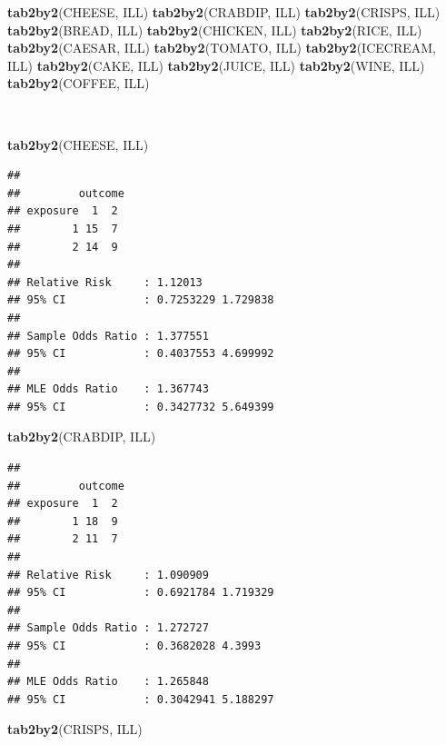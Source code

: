 \documentclass[12pt,a4paper]{book}
\newenvironment{Shaded}{\begin{snugshade}}{\end{snugshade}}
\newcommand{\KeywordTok}[1]{\textcolor[rgb]{0.13,0.29,0.53}{\textbf{#1}}}
\newcommand{\NormalTok}[1]{#1}
\theoremstyle{definition}
\theoremstyle{definition}
\theoremstyle{definition}
\theoremstyle{remark}
\begin{document}
\begin{Shaded}
\begin{Highlighting}[]
\KeywordTok{tab2by2}\NormalTok{(CHEESE, ILL)}
\KeywordTok{tab2by2}\NormalTok{(CRABDIP, ILL)}
\KeywordTok{tab2by2}\NormalTok{(CRISPS, ILL)}
\KeywordTok{tab2by2}\NormalTok{(BREAD, ILL)}
\KeywordTok{tab2by2}\NormalTok{(CHICKEN, ILL)}
\KeywordTok{tab2by2}\NormalTok{(RICE, ILL)}
\KeywordTok{tab2by2}\NormalTok{(CAESAR, ILL)}
\KeywordTok{tab2by2}\NormalTok{(TOMATO, ILL)}
\KeywordTok{tab2by2}\NormalTok{(ICECREAM, ILL)}
\KeywordTok{tab2by2}\NormalTok{(CAKE, ILL)}
\KeywordTok{tab2by2}\NormalTok{(JUICE, ILL)}
\KeywordTok{tab2by2}\NormalTok{(WINE, ILL)}
\KeywordTok{tab2by2}\NormalTok{(COFFEE, ILL)}
\end{Highlighting}
\end{Shaded}

~

\begin{Shaded}
\begin{Highlighting}[]
\KeywordTok{tab2by2}\NormalTok{(CHEESE, ILL)}
\end{Highlighting}
\end{Shaded}

\begin{verbatim}
## 
##         outcome
## exposure  1  2
##        1 15  7
##        2 14  9
## 
## Relative Risk     : 1.12013 
## 95% CI            : 0.7253229 1.729838 
## 
## Sample Odds Ratio : 1.377551 
## 95% CI            : 0.4037553 4.699992 
## 
## MLE Odds Ratio    : 1.367743 
## 95% CI            : 0.3427732 5.649399
\end{verbatim}

\newpage

\begin{Shaded}
\begin{Highlighting}[]
\KeywordTok{tab2by2}\NormalTok{(CRABDIP, ILL)}
\end{Highlighting}
\end{Shaded}

\begin{verbatim}
## 
##         outcome
## exposure  1  2
##        1 18  9
##        2 11  7
## 
## Relative Risk     : 1.090909 
## 95% CI            : 0.6921784 1.719329 
## 
## Sample Odds Ratio : 1.272727 
## 95% CI            : 0.3682028 4.3993 
## 
## MLE Odds Ratio    : 1.265848 
## 95% CI            : 0.3042941 5.188297
\end{verbatim}

\begin{Shaded}
\begin{Highlighting}[]
\KeywordTok{tab2by2}\NormalTok{(CRISPS, ILL)}
\end{Highlighting}
\end{Shaded}
\end{document}
